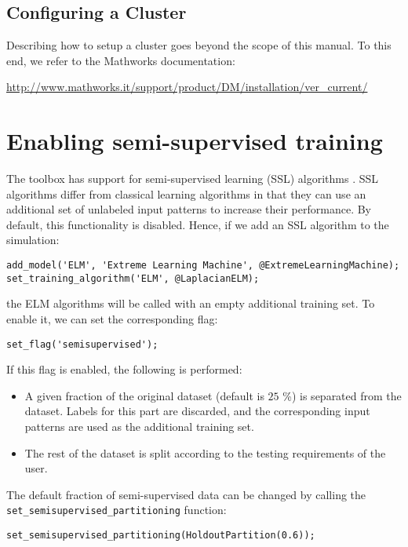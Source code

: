 \subsection{Configuring a Cluster}

Describing how to setup a cluster goes beyond the scope of this manual. To this end, we refer to the Mathworks documentation:

\url{http://www.mathworks.it/support/product/DM/installation/ver_current/}


\section{Enabling semi-supervised training}

The toolbox has support for semi-supervised learning (SSL) algorithms \cite{chapelle2006semi}. SSL algorithms differ from classical learning algorithms in that they can use an additional set of unlabeled input patterns to increase their performance. By default, this functionality is disabled. Hence, if we add an SSL algorithm to the simulation:

\begin{lstlisting}
add_model('ELM', 'Extreme Learning Machine', @ExtremeLearningMachine);
set_training_algorithm('ELM', @LaplacianELM);
\end{lstlisting}

\noindent the ELM algorithms will be called with an empty additional training set. To enable it, we can set the corresponding flag:

\begin{lstlisting}
set_flag('semisupervised');
\end{lstlisting}

\noindent If this flag is enabled, the following is performed:

\begin{itemize}
	\item A given fraction of the original dataset (default is $25$ \%) is separated from the dataset. Labels for this part are discarded, and the corresponding input patterns are used as the additional training set.
	\item The rest of the dataset is split according to the testing requirements of the user.
\end{itemize}

The default fraction of semi-supervised data can be changed by calling the \verb|set_semisupervised_partitioning| function:

\begin{lstlisting}
set_semisupervised_partitioning(HoldoutPartition(0.6));
\end{lstlisting}

